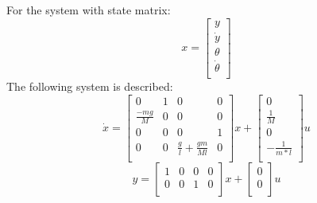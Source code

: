 For the system with state matrix:
\begin{equation}
x = \begin{bmatrix}
y\\
\dot y\\
\theta\\
\dot \theta\\
\end{bmatrix}
\end{equation}
The following system is described:
\begin{equation}
\dot x = \begin{bmatrix}
0&1&0&0\\
\frac{-mg}{M}&0&0&0\\
0&0&0&1\\
0&0&\frac g l + \frac {gm} {Ml}&0\\
\end{bmatrix}
x + \begin{bmatrix}
0\\
\frac 1 M\\
0\\
-\frac 1 {m*l}\\
\end{bmatrix}
u
\end{equation}
\begin{equation}
y = \begin{bmatrix}
1&0&0&0\\
0&0&1&0\\
\end{bmatrix}
x + \begin{bmatrix}
0\\
0\\
\end{bmatrix}
u
\end{equation}

